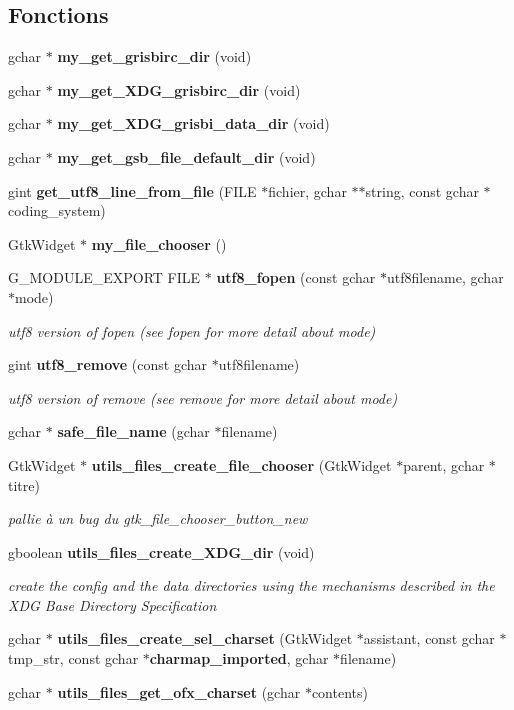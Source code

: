 \subsection*{Fonctions}
\begin{DoxyCompactItemize}
\item 
gchar $\ast$ {\bf my\_\-get\_\-grisbirc\_\-dir} (void)
\item 
gchar $\ast$ {\bf my\_\-get\_\-XDG\_\-grisbirc\_\-dir} (void)
\item 
gchar $\ast$ {\bf my\_\-get\_\-XDG\_\-grisbi\_\-data\_\-dir} (void)
\item 
gchar $\ast$ {\bf my\_\-get\_\-gsb\_\-file\_\-default\_\-dir} (void)
\item 
gint {\bf get\_\-utf8\_\-line\_\-from\_\-file} (FILE $\ast$fichier, gchar $\ast$$\ast$string, const gchar $\ast$coding\_\-system)
\item 
GtkWidget $\ast$ {\bf my\_\-file\_\-chooser} ()
\item 
G\_\-MODULE\_\-EXPORT FILE $\ast$ {\bf utf8\_\-fopen} (const gchar $\ast$utf8filename, gchar $\ast$mode)
\begin{DoxyCompactList}\small\item\em utf8 version of fopen (see fopen for more detail about mode) \item\end{DoxyCompactList}\item 
gint {\bf utf8\_\-remove} (const gchar $\ast$utf8filename)
\begin{DoxyCompactList}\small\item\em utf8 version of remove (see remove for more detail about mode) \item\end{DoxyCompactList}\item 
gchar $\ast$ {\bf safe\_\-file\_\-name} (gchar $\ast$filename)
\item 
GtkWidget $\ast$ {\bf utils\_\-files\_\-create\_\-file\_\-chooser} (GtkWidget $\ast$parent, gchar $\ast$titre)
\begin{DoxyCompactList}\small\item\em pallie à un bug du gtk\_\-file\_\-chooser\_\-button\_\-new \item\end{DoxyCompactList}\item 
gboolean {\bf utils\_\-files\_\-create\_\-XDG\_\-dir} (void)
\begin{DoxyCompactList}\small\item\em create the config and the data directories using the mechanisms described in the XDG Base Directory Specification \item\end{DoxyCompactList}\item 
gchar $\ast$ {\bf utils\_\-files\_\-create\_\-sel\_\-charset} (GtkWidget $\ast$assistant, const gchar $\ast$tmp\_\-str, const gchar $\ast${\bf charmap\_\-imported}, gchar $\ast$filename)
\item 
gchar $\ast$ {\bf utils\_\-files\_\-get\_\-ofx\_\-charset} (gchar $\ast$contents)
\end{DoxyCompactItemize}
